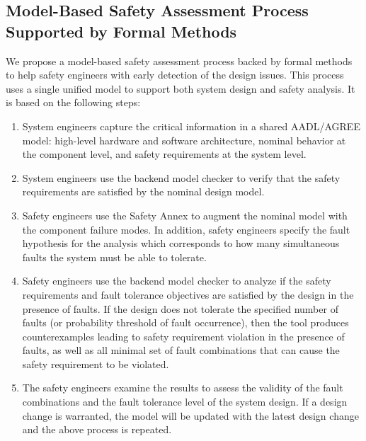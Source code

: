 \subsection{Model-Based Safety Assessment Process Supported by Formal Methods}
\label{subsec:process}
We propose a model-based safety assessment process backed by formal methods to help safety engineers with early detection of the design issues.  This process uses a single unified model to support both system design and safety analysis. It is based on the following steps:

\begin{enumerate}
	\item System engineers capture the critical information in a shared AADL/AGREE model:  high-level hardware and software architecture, nominal behavior at the component level, and safety requirements at the system level.%
	\item System engineers use the backend model checker to verify that the safety requirements are satisfied by the nominal design model. 
	\item Safety engineers use the Safety Annex to augment the nominal model with the component failure modes. %
	In addition, safety engineers specify the fault hypothesis for the analysis which corresponds to how many simultaneous faults the system must be able to tolerate.
	\item Safety engineers use the backend model checker to analyze if the safety requirements and fault tolerance objectives are satisfied by the design in the presence of faults. %
	If the design does not tolerate the specified number of faults (or probability threshold of fault occurrence), then the tool produces counterexamples leading to safety requirement violation in the presence of faults, %
	 as well as all minimal set of fault combinations that can cause the safety requirement to be violated.
	\item The safety engineers examine the results to assess the validity of the fault combinations and the fault tolerance level of the system design. If a design change is warranted, the model will be updated with the latest design change and the above process is repeated.
\end{enumerate}


